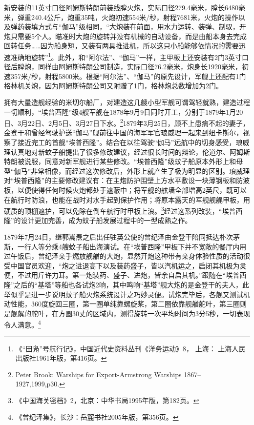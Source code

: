 \documentclass[12pt,UTF8]{ctexbook}
\begin{document}
新安装的11英寸口径阿姆斯特朗前装线膛火炮，实际口径279.4毫米，膛长6480毫米，弹重240.4公斤，炮重35吨，火炮初速554米/秒，射程7681米，火炮的操作以及弹药装填方式与“伽马”级相同，“大炮装在前面，用水力运转、装弹、制驭，开炮只需要5个人。瞄准时大炮的旋转并没有机械的自动设备，而是由船本身去完成回转任务……因为船身短，又装有两具推进机，所以这只小船能够依情况的需要迅速准确地旋转”\footnote{《“田凫”号航行记》，中国近代史资料丛刊《洋务运动》8， 上海： 上海人民出版社1961年版，第416页。}。此外，和“阿尔法”、“伽马”一样，主甲板上还安装有2门3英寸口径后膛炮，同样由阿姆斯特朗公司制造，实际口径76.2毫米，炮身长1920毫米，初速357米/秒，射程5800米。根据“阿尔法”、“伽马”的原先设计，军舰上还配有1门格林机关炮，因为阿姆斯特朗公司又附赠了1门，格林炮总数增加为2门。

拥有大量造舰经验的米切尔船厂，对建造这几艘小型军舰可谓驾轻就熟，建造过程一切顺利，“埃普西隆”级4艘军舰在1878年9月9日同时开工，分别于1879年1月20日、3月22日、2月5日、3月27日下水。\footnote{Peter Brook: Warships for Export-Armstrong Warships 1867--1927,1999,p30.}1879年3月25日，顾不上患病不起的妻子，金登干和曾经驾驶护送“伽马”舰前往中国的海军军官琅威理一起来到纽卡斯尔，视察了接近完工的首舰“埃普西隆”。结合在以往驾驶“伽马”远航中的切身感受，琅威理认真地对新蚊子船提出了很多修改建议，经过很长时间的辩论，伦道尔、阿姆斯特朗被说服，同意对新军舰进行某些修改。“埃普西隆”级蚊子船原本外形上和母型“伽马”非常相像，而经过这次修改后，外形上就产生了极为明显的区别。琅威理对“埃普西隆”的主要修改建议有：在主炮防护围壁上方水平敷设一块薄钢板和防波板，以便使得任何时候火炮都处于遮蔽中；将军舰的舷墙全部增高2英尺，既可以在航行时防浪，也能在战时对水手起到保护作用；将原本露天的军舰舰艉甲板，用硬质的顶棚遮护，可以免除在倒车航行时甲板上浪。\footnote{《中国海关密档》2，北京：中华书局1995年版，第182页。}经过这系列改装，“埃普西隆”的设计更加完善，成为蚊子船发展过程中的一型成熟之作。

1879年7月24日，继郭嵩焘之后出任驻英公使的曾纪泽由金登干陪同抵达朴次茅斯，一行人等分乘4艘蚊子船出海演试。在“埃普西隆”甲板下并不宽敞的餐厅内用过午饭后，曾纪泽亲手燃放舰艏的大炮，显然开炮这种带有亲身体验性质的活动很受中国官员欢迎，“炮之进退高下以及装药盛子，皆以汽机运之，启闭其机极为灵便，不过用斤许力耳。第一炮装药、盛子、进炮，皆余自启其机。”跟随在“埃普西隆”之后的“基塔”等船也各试炮2响，其中鸣响“基塔”舰大炮的是金登干的夫人，此举似乎是进一步说明蚊子船火炮系统设计之巧妙灵便。试炮完毕后，各舰又测试机动性能，360度旋回三圈，第一圈单纯靠螺旋桨，第二圈依靠舰艏舵叶，第三圈则是舰艉的舵叶，在方圆30丈的区域内，测得旋转一次平均时间为3分5秒，一切表现令人满意。\footnote{《曾纪泽集》，长沙：岳麓书社2005年版，第356页。}
\end{document}
